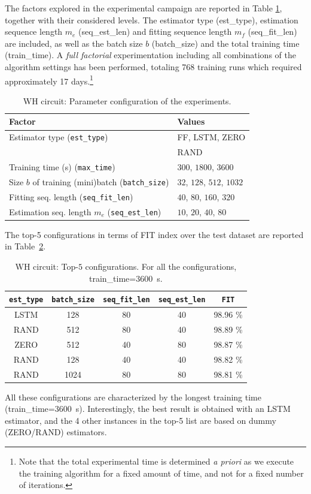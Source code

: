 \documentclass{article}
\newcommand{\batchsize}{b}
\newcommand{\seqlen}{m}
\begin{document}
The factors explored in the experimental campaign are  reported in Table \ref{tab:parameters_wh}, together with their considered levels. The estimator type (est\_type), estimation sequence length $\seqlen_e$ (seq\_est\_len) and fitting sequence length $\seqlen_f$ (seq\_fit\_len) are included, as well as the batch size $\batchsize$ (batch\_size) and the total training time (train\_time).
A \emph{full factorial} experimentation including
all combinations of the algorithm settings has been performed, totaling 768 training runs which required approximately 17 days.\footnote{Note that the total experimental time is determined \emph{a priori} as we execute the training algorithm for a fixed amount of time, and not for a fixed number of iterations.}
\begin{table}%
    \centering
    \begin{tabular}{|l||l|}
    \hline
    Factor &  Values \\
    \hline
Estimator type (\texttt{est\_type}) & FF, LSTM, ZERO \\
& RAND \\
\hline 
Training time (s) (\texttt{max\_time}) & $300$, $1800$, $3600$ \\
\hline 
Size $b$ of training (mini)batch    (\texttt{batch\_size}) & $32$, $128$, $512$, $1032$ \\ 
\hline
Fitting seq. length (\texttt{seq\_fit\_len}) &  $40$, $80$, $160$, $320$ \\
\hline
Estimation seq. length $m_e$  (\texttt{seq\_est\_len}) &  $10$, $20$, $40$, $80$ \\
\hline 
    \end{tabular}
    \vspace{0.2cm}
    \caption{WH circuit: Parameter configuration of the experiments.}
    \label{tab:parameters_wh}
\end{table}

The top-5 configurations in terms of FIT index over the test dataset are reported in Table~\ref{tab:top_config_wh}.
\begin{table}[t!]
    \centering
    \begin{tabular}{|c|c|c|c|c|}
    \hline
    \texttt{est\_type}  & \texttt{batch\_size} & \texttt{seq\_fit\_len} & \texttt{seq\_est\_len} & \texttt{FIT} \\
    \hline
LSTM  & 128 & 80 & 40 & 98.96 \% \\
RAND  & 512 & 80 & 40 & 98.89 \% \\
ZERO & 512 & 40  & 80 & 98.87 \% \\
RAND  & 128 & 40 & 40 & 98.82 \% \\
RAND & 1024 & 80 & 80 &  98.81 \% \\
\hline
\end{tabular}
\vspace{0.2cm}
    \caption{WH circuit: Top-$5$ configurations. For all the configurations, train\_time=3600~s.}
    \label{tab:top_config_wh}
\end{table}
All these configurations are characterized by the longest training time (train\_time=3600~s). Interestingly, the best result is obtained with an LSTM estimator, and the 4 other instances in the top-5 list are based on dummy (ZERO/RAND) estimators. 
\end{document}
